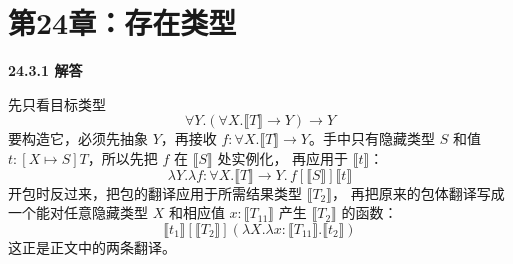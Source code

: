 \newpage
\section*{第24章：存在类型}

\begin{taplsolutionentrybox}
\label{sol:translator:24.3.1}
\textbf{24.3.1 解答}

先只看目标类型
\[
\forall Y.(\forall X.\llbracket T\rrbracket\to Y)\to Y
\]
要构造它，必须先抽象 \(Y\)，再接收
\(f:\forall X.\llbracket T\rrbracket\to Y\)。手中只有隐藏类型 \(S\) 和值
\(t:[X\mapsto S]T\)，所以先把 \(f\) 在 \(\llbracket S\rrbracket\) 处实例化，
再应用于 \(\llbracket t\rrbracket\)：
\[
\lambda Y.\lambda f:\forall X.\llbracket T\rrbracket\to Y.\,
f[\llbracket S\rrbracket]\llbracket t\rrbracket
\]
开包时反过来，把包的翻译应用于所需结果类型 \(\llbracket T_2\rrbracket\)，
再把原来的包体翻译写成一个能对任意隐藏类型 \(X\) 和相应值
\(x:\llbracket T_{11}\rrbracket\) 产生 \(\llbracket T_2\rrbracket\) 的函数：
\[
\llbracket t_1\rrbracket[\llbracket T_2\rrbracket]
(\lambda X.\lambda x:\llbracket T_{11}\rrbracket.\llbracket t_2\rrbracket)
\]
这正是正文中的两条翻译。
\end{taplsolutionentrybox}
